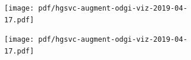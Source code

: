 \documentclass{article}
\begin{document}
\clearpage
\begin{figure}
  \begin{subfigure}[b]{\textwidth}
    \caption{}
    \texttt{[image: pdf/hgsvc-augment-odgi-viz-2019-04-17.pdf]}
  \end{subfigure}
  \begin{subfigure}[b]{\textwidth}
    \caption{}
    \texttt{[image: pdf/hgsvc-augment-odgi-viz-2019-04-17.pdf]}
  \end{subfigure}
\end{figure}
\end{document}
